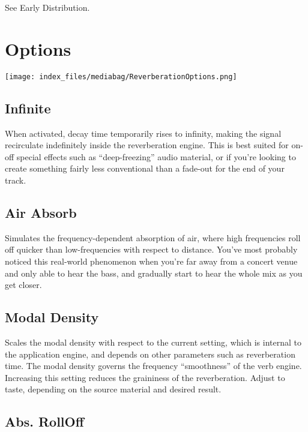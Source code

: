 \documentclass[
  letterpaper,
  DIV=11,
  numbers=noendperiod]{scrreport}
\begin{document}
See Early Distribution.

\hypertarget{options-1}{%
\section{Options}\label{options-1}}

\texttt{[image: index\_files/mediabag/ReverberationOptions.png]}

\hypertarget{infinite}{%
\subsection{Infinite}\label{infinite}}

When activated, decay time temporarily rises to infinity, making the
signal recirculate indefinitely inside the reverberation engine. This is
best suited for on-off special effects such as ``deep-freezing'' audio
material, or if you're looking to create something fairly less
conventional than a fade-out for the end of your track.

\hypertarget{air-absorb}{%
\subsection{Air Absorb}\label{air-absorb}}

Simulates the frequency-dependent absorption of air, where high
frequencies roll off quicker than low-frequencies with respect to
distance. You've most probably noticed this real-world phenomenon when
you're far away from a concert venue and only able to hear the bass, and
gradually start to hear the whole mix as you get closer.

\hypertarget{modal-density}{%
\subsection{Modal Density}\label{modal-density}}

Scales the modal density with respect to the current setting, which is
internal to the application engine, and depends on other parameters such
as reverberation time. The modal density governs the frequency
``smoothness'' of the verb engine. Increasing this setting reduces the
graininess of the reverberation. Adjust to taste, depending on the
source material and desired result.

\hypertarget{abs.-rolloff}{%
\subsection{Abs. RollOff}\label{abs.-rolloff}}
\end{document}
